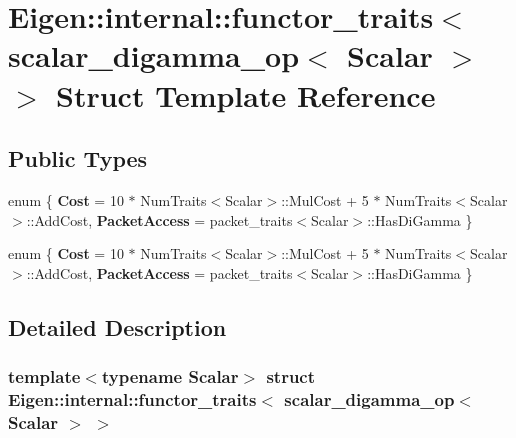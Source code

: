 \hypertarget{struct_eigen_1_1internal_1_1functor__traits_3_01scalar__digamma__op_3_01_scalar_01_4_01_4}{}\section{Eigen\+:\+:internal\+:\+:functor\+\_\+traits$<$ scalar\+\_\+digamma\+\_\+op$<$ Scalar $>$ $>$ Struct Template Reference}
\label{struct_eigen_1_1internal_1_1functor__traits_3_01scalar__digamma__op_3_01_scalar_01_4_01_4}
\subsection*{Public Types}
\begin{DoxyCompactItemize}
\item 
\mbox{\label{struct_eigen_1_1internal_1_1functor__traits_3_01scalar__digamma__op_3_01_scalar_01_4_01_4_a90fa81570fff72dd59da13be090f6ab2}} 
enum \{ {\bfseries Cost} = 10 $\ast$ Num\+Traits$<$Scalar$>$\+:\+:Mul\+Cost + 5 $\ast$ Num\+Traits$<$Scalar$>$\+:\+:Add\+Cost, 
{\bfseries Packet\+Access} = packet\+\_\+traits$<$Scalar$>$\+:\+:Has\+Di\+Gamma
 \}
\item 
\mbox{\label{struct_eigen_1_1internal_1_1functor__traits_3_01scalar__digamma__op_3_01_scalar_01_4_01_4_aa4a54eff40e421b5f45b5b469f7d7779}} 
enum \{ {\bfseries Cost} = 10 $\ast$ Num\+Traits$<$Scalar$>$\+:\+:Mul\+Cost + 5 $\ast$ Num\+Traits$<$Scalar$>$\+:\+:Add\+Cost, 
{\bfseries Packet\+Access} = packet\+\_\+traits$<$Scalar$>$\+:\+:Has\+Di\+Gamma
 \}
\end{DoxyCompactItemize}


\subsection{Detailed Description}
\subsubsection*{template$<$typename Scalar$>$\newline
struct Eigen\+::internal\+::functor\+\_\+traits$<$ scalar\+\_\+digamma\+\_\+op$<$ Scalar $>$ $>$}



